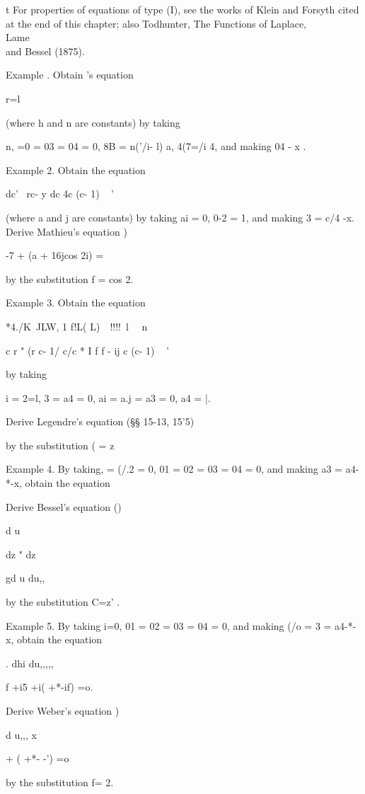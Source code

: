 t For properties of equations of type (I), see the works of Klein and
Forsyth cited at the end of this chapter; also Todhunter, The
Functions of Laplace, \\Lame\\ and Bessel (1875).

%
%

Example . Obtain \Lame's equation

r=l

(where h and n are constants) by taking

n, =0 = 03 = 04 = 0, 8B = n('/i- l) a, 4(7=/i 4, and making 04 - x .

Example 2. Obtain the equation

dc' \ rc- y dc 4c (c- 1) ~ '

(where a and j are constants) by taking ai = 0, 0-2 = 1, and making 3
= c/4 -x. Derive Mathieu's equation )

-7 + (a + 16jcos 2i) =

by the substitution f = cos 2.

Example 3. Obtain the equation

 *4./K\ JLW, 1 f!L( L)\ \ !!!!\ l \ \ n

c r " (r c- 1/ c/c * I f f - ij c (c- 1) ~ '

by taking

 i = 2=l, 3 = a4 = 0, ai = a.j = a3 = 0, a4 = |.

Derive Legendre's equation (§§ 15-13, 15'5)

by the substitution ( = z~\

Example 4. By taking, = (/.2 = 0, 01 = 02 = 03 = 04 = 0, and making
a3 = a4-*-x, obtain the equation

Derive Bessel's equation ()

d u

dz " dz

gd u du,,

by the substitution C=z' .

Example 5. By taking i=0, 01 = 02 = 03 = 04 = 0, and making (/o = 3 =
a4-*-x, obtain the equation

. dhi du,,,,,

f +i5 +i( +*-if) =o.

Derive Weber's equation )

d u,,, x

  + ( +*- -') =o

by the substitution f= 2.

